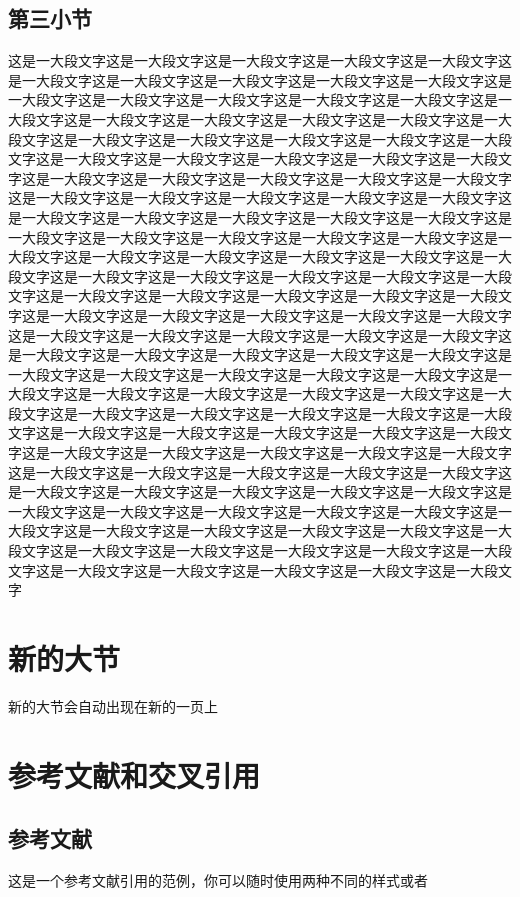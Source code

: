 \documentclass{CustGraduPaper}
\begin{document}
\section{第三小节}
这是一大段文字这是一大段文字这是一大段文字这是一大段文字这是一大段文字这是一大段文字这是一大段文字这是一大段文字这是一大段文字这是一大段文字这是一大段文字这是一大段文字这是一大段文字这是一大段文字这是一大段文字这是一大段文字这是一大段文字这是一大段文字这是一大段文字这是一大段文字这是一大段文字这是一大段文字这是一大段文字这是一大段文字这是一大段文字这是一大段文字这是一大段文字这是一大段文字这是一大段文字这是一大段文字这是一大段文字这是一大段文字这是一大段文字这是一大段文字这是一大段文字这是一大段文字这是一大段文字这是一大段文字这是一大段文字这是一大段文字这是一大段文字这是一大段文字这是一大段文字这是一大段文字这是一大段文字这是一大段文字这是一大段文字这是一大段文字这是一大段文字这是一大段文字这是一大段文字这是一大段文字这是一大段文字这是一大段文字这是一大段文字这是一大段文字这是一大段文字这是一大段文字这是一大段文字这是一大段文字这是一大段文字这是一大段文字这是一大段文字这是一大段文字这是一大段文字这是一大段文字这是一大段文字这是一大段文字这是一大段文字这是一大段文字这是一大段文字这是一大段文字这是一大段文字这是一大段文字这是一大段文字这是一大段文字这是一大段文字这是一大段文字这是一大段文字这是一大段文字这是一大段文字这是一大段文字这是一大段文字这是一大段文字这是一大段文字这是一大段文字这是一大段文字这是一大段文字这是一大段文字这是一大段文字这是一大段文字这是一大段文字这是一大段文字这是一大段文字这是一大段文字这是一大段文字这是一大段文字这是一大段文字这是一大段文字这是一大段文字这是一大段文字这是一大段文字这是一大段文字这是一大段文字这是一大段文字这是一大段文字这是一大段文字这是一大段文字这是一大段文字这是一大段文字这是一大段文字这是一大段文字这是一大段文字这是一大段文字这是一大段文字这是一大段文字这是一大段文字这是一大段文字这是一大段文字这是一大段文字这是一大段文字这是一大段文字这是一大段文字这是一大段文字这是一大段文字这是一大段文字这是一大段文字这是一大段文字这是一大段文字这是一大段文字这是一大段文字这是一大段文字这是一大段文字这是一大段文字这是一大段文字这是一大段文字这是一大段文字这是一大段文字这是一大段文字
\chapter{新的大节}
新的大节会自动出现在新的一页上
\chapter{参考文献和交叉引用}\label{ch:ref}
\section{参考文献}\label{sec:bibs}
这是一个参考文献引用的范例\cite{Stone_1998}，你可以随时使用两种不同的样式\cite{Stone_1998}或者
\end{document}
